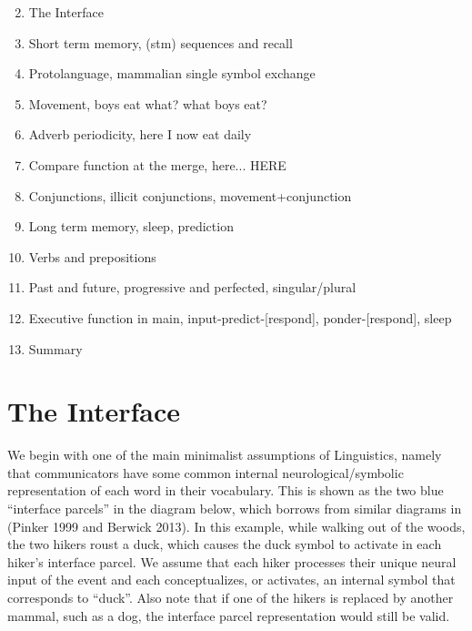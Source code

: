 \documentclass{clv3}
\begin{document}
\begin{enumerate}

\setcounter{enumi}{1}
\item The Interface
\item Short term memory, (stm) sequences and recall
\item Protolanguage,  mammalian single symbol exchange	
\item Movement, boys eat what?   what boys eat?
\item Adverb periodicity, here I now eat daily
\item Compare function at the merge, here... HERE
\item Conjunctions, illicit conjunctions, movement+conjunction
\item Long  term memory, sleep, prediction
\item Verbs and prepositions
\item Past and future, progressive and perfected, singular/plural

\item Executive function in main{},  input-predict-[respond], ponder-[respond], sleep

\item Summary

\end{enumerate}






\section{The Interface }

 We begin with one of the main minimalist assumptions of Linguistics, namely that communicators have some common internal neurological/symbolic representation of each word in their vocabulary.  This is shown as the two blue “interface parcels” in the diagram below, which borrows from similar diagrams in (Pinker 1999 and Berwick 2013).   In this example, while walking out of the woods, the two hikers roust a duck, which causes the duck symbol to activate in each hiker’s interface parcel.   We assume that each hiker processes their unique neural input of the event and each conceptualizes, or activates,  an internal symbol that corresponds to “duck”.   Also note that if one of the hikers is replaced by another mammal, such as a dog, the interface parcel representation would still be valid.
\end{document}
